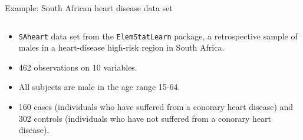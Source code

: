 \documentclass[10pt,ignorenonframetext,]{beamer}
\providecommand{\tightlist}{%
  \setlength{\itemsep}{0pt}\setlength{\parskip}{0pt}}
\begin{document}
\begin{frame}[fragile]

\begin{block}{Example: South African heart disease data set}

\(~\)

\begin{itemize}
\tightlist
\item
  \texttt{SAheart} data set from the \texttt{ElemStatLearn} package, a
  retrospective sample of males in a heart-disease high-risk region in
  South Africa.
\end{itemize}

\vspace{2mm}

\begin{itemize}
\tightlist
\item
  462 observations on 10 variables.
\end{itemize}

\vspace{2mm}

\begin{itemize}
\tightlist
\item
  All subjects are male in the age range 15-64.
\end{itemize}

\vspace{2mm}

\begin{itemize}
\tightlist
\item
  160 cases (individuals who have suffered from a conorary heart
  disease) and 302 controls (individuals who have not suffered from a
  conorary heart disease).
\end{itemize}

\end{block}

\end{frame}
\end{document}
